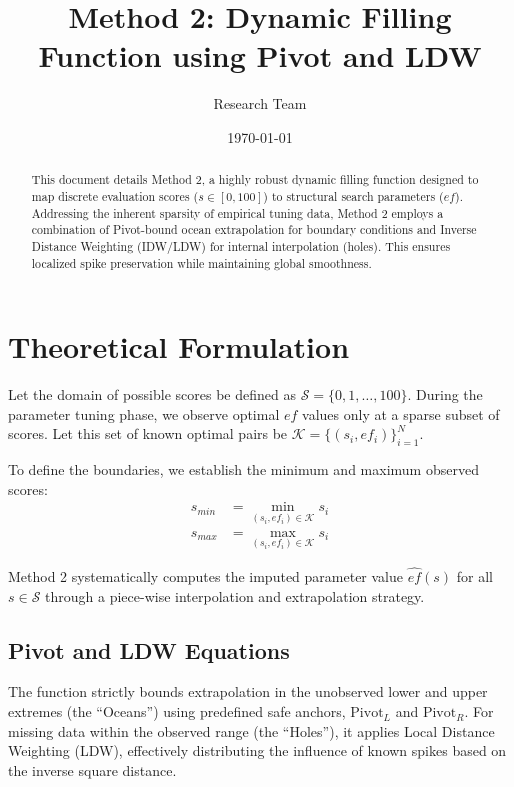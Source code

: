\documentclass[11pt,a4paper]{article}
\title{\textbf{Method 2: Dynamic Filling Function using Pivot and LDW}}
\author{Research Team}
\date{\today}
\begin{document}
\maketitle

\begin{abstract}
This document details Method 2, a highly robust dynamic filling function designed to map discrete evaluation scores ($s \in [0, 100]$) to structural search parameters ($ef$). Addressing the inherent sparsity of empirical tuning data, Method 2 employs a combination of Pivot-bound ocean extrapolation for boundary conditions and Inverse Distance Weighting (IDW/LDW) for internal interpolation (holes). This ensures localized spike preservation while maintaining global smoothness.
\end{abstract}

\section{Theoretical Formulation}

Let the domain of possible scores be defined as $\mathcal{S} = \{0, 1, \dots, 100\}$. During the parameter tuning phase, we observe optimal $ef$ values only at a sparse subset of scores. Let this set of known optimal pairs be $\mathcal{K} = \{(s_i, ef_i)\}_{i=1}^N$.

To define the boundaries, we establish the minimum and maximum observed scores:
\begin{align*}
    s_{min} &= \min_{(s_i, ef_i) \in \mathcal{K}} s_i \\
    s_{max} &= \max_{(s_i, ef_i) \in \mathcal{K}} s_i
\end{align*}

Method 2 systematically computes the imputed parameter value $\hat{ef}(s)$ for all $s \in \mathcal{S}$ through a piece-wise interpolation and extrapolation strategy.

\subsection{Pivot and LDW Equations}
The function strictly bounds extrapolation in the unobserved lower and upper extremes (the ``Oceans'') using predefined safe anchors, $\text{Pivot}_L$ and $\text{Pivot}_R$. For missing data within the observed range (the ``Holes''), it applies Local Distance Weighting (LDW), effectively distributing the influence of known spikes based on the inverse square distance.
\end{document}
